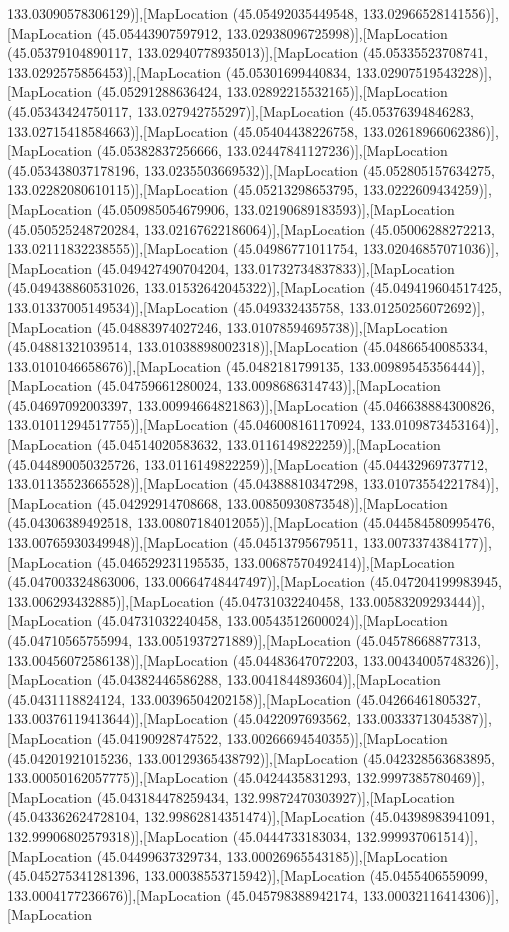 133.03090578306129)],[MapLocation (45.05492035449548, 133.02966528141556)],[MapLocation (45.05443907597912, 133.02938096725998)],[MapLocation (45.05379104890117, 133.02940778935013)],[MapLocation (45.05335523708741, 133.0292575856453)],[MapLocation (45.05301699440834, 133.02907519543228)],[MapLocation (45.05291288636424, 133.02892215532165)],[MapLocation (45.05343424750117, 133.027942755297)],[MapLocation (45.05376394846283, 133.02715418584663)],[MapLocation (45.05404438226758, 133.02618966062386)],[MapLocation (45.05382837256666, 133.02447841127236)],[MapLocation (45.053438037178196, 133.0235503669532)],[MapLocation (45.052805157634275, 133.02282080610115)],[MapLocation (45.05213298653795, 133.0222609434259)],[MapLocation (45.050985054679906, 133.02190689183593)],[MapLocation (45.050525248720284, 133.02167622186064)],[MapLocation (45.05006288272213, 133.02111832238555)],[MapLocation (45.04986771011754, 133.02046857071036)],[MapLocation (45.049427490704204, 133.01732734837833)],[MapLocation (45.049438860531026, 133.01532642045322)],[MapLocation (45.049419604517425, 133.01337005149534)],[MapLocation (45.049332435758, 133.01250256072692)],[MapLocation (45.04883974027246, 133.01078594695738)],[MapLocation (45.04881321039514, 133.01038898002318)],[MapLocation (45.04866540085334, 133.0101046658676)],[MapLocation (45.0482181799135, 133.00989545356444)],[MapLocation (45.04759661280024, 133.0098686314743)],[MapLocation (45.04697092003397, 133.00994664821863)],[MapLocation (45.046638884300826, 133.01011294517755)],[MapLocation (45.046008161170924, 133.0109873453164)],[MapLocation (45.04514020583632, 133.0116149822259)],[MapLocation (45.044890050325726, 133.0116149822259)],[MapLocation (45.04432969737712, 133.01135523665528)],[MapLocation (45.04388810347298, 133.01073554221784)],[MapLocation (45.04292914708668, 133.00850930873548)],[MapLocation (45.04306389492518, 133.00807184012055)],[MapLocation (45.044584580995476, 133.00765930349948)],[MapLocation (45.04513795679511, 133.0073374384177)],[MapLocation (45.046529231195535, 133.00687570492414)],[MapLocation (45.047003324863006, 133.00664748447497)],[MapLocation (45.047204199983945, 133.006293432885)],[MapLocation (45.04731032240458, 133.00583209293444)],[MapLocation (45.04731032240458, 133.00543512600024)],[MapLocation (45.04710565755994, 133.0051937271889)],[MapLocation (45.04578668877313, 133.00456072586138)],[MapLocation (45.04483647072203, 133.00434005748326)],[MapLocation (45.04382446586288, 133.0041844893604)],[MapLocation (45.0431118824124, 133.00396504202158)],[MapLocation (45.04266461805327, 133.00376119413644)],[MapLocation (45.0422097693562, 133.00333713045387)],[MapLocation (45.04190928747522, 133.00266694540355)],[MapLocation (45.04201921015236, 133.00129365438792)],[MapLocation (45.042328563683895, 133.00050162057775)],[MapLocation (45.0424435831293, 132.9997385780469)],[MapLocation (45.043184478259434, 132.99872470303927)],[MapLocation (45.043362624728104, 132.99862814351474)],[MapLocation (45.04398983941091, 132.99906802579318)],[MapLocation (45.0444733183034, 132.999937061514)],[MapLocation (45.04499637329734, 133.00026965543185)],[MapLocation (45.045275341281396, 133.00038553715942)],[MapLocation (45.0455406559099, 133.0004177236676)],[MapLocation (45.045798388942174, 133.00032116414306)],[MapLocation 